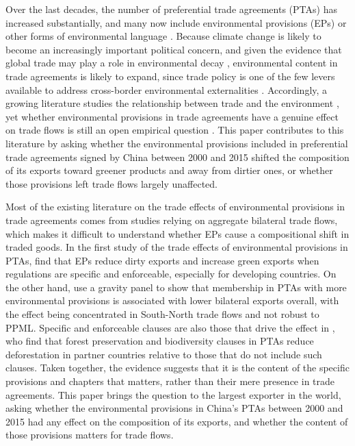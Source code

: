\documentclass[12pt]{article}
\begin{document}
Over the last decades, the number of preferential trade agreements (PTAs) has increased substantially, and many now include environmental provisions (EPs) or other forms of environmental language \citep{morin2017, mattooHandbookDeepTrade2020}. Because climate change is likely to become an increasingly important political concern, and given the evidence that global trade may play a role in environmental decay \citep{zhangTransboundaryHealthImpacts2017}, environmental content in trade agreements is likely to expand, since trade policy is one of the few levers available to address cross-border environmental externalities \citep{frankel2009}. Accordingly, a growing literature studies the relationship between trade and the environment \citep{copeland2022}, yet whether environmental provisions in trade agreements have a genuine effect on trade flows is still an open empirical question \citep{gutsch2025, felbermayr2025}. This paper contributes to this literature by asking whether the environmental provisions included in preferential trade agreements signed by China between 2000 and 2015 shifted the composition of its exports toward greener products and away from dirtier ones, or whether those provisions left trade flows largely unaffected.

Most of the existing literature on the trade effects of environmental provisions in trade agreements comes from studies relying on aggregate bilateral trade flows, which makes it difficult to understand whether EPs cause a compositional shift in traded goods. In the first study of the trade effects of environmental provisions in PTAs, \citet{brandi2020} find that EPs reduce dirty exports and increase green exports when regulations are specific and enforceable, especially for developing countries. On the other hand, \citet{berger2020} use a gravity panel to show that membership in PTAs with more environmental provisions is associated with lower bilateral exports overall, with the effect being concentrated in South-North trade flows and not robust to PPML. Specific and enforceable clauses are also those that drive the effect in \cite{abman2024}, who find that forest preservation and biodiversity clauses in PTAs reduce deforestation in partner countries relative to those that do not include such clauses. Taken together, the evidence suggests that it is the content of the specific provisions and chapters that matters, rather than their mere presence in trade agreements. This paper brings the question to the largest exporter in the world, asking whether the environmental provisions in China's PTAs between 2000 and 2015 had any effect on the composition of its exports, and whether the content of those provisions matters for trade flows.
\end{document}
